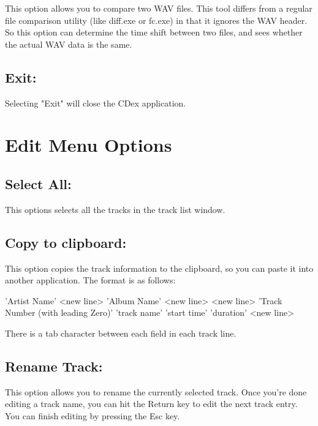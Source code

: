 This option allows you to compare two WAV files. This tool differs from a
regular file comparison utility (like diff.exe or fc.exe) in that it ignores
the WAV header. So this option can determine the time shift between two files, and
sees whether the actual WAV data is the same.


\subsection{Exit:}

Selecting "Exit" will close the CDex application.


\section{Edit Menu Options}


\subsection{Select All:}

This options selects all the tracks in the track list window.

\subsection{Copy to clipboard:}

This option copies the track information to the clipboard, so you can paste
it into another application. The format is as follows:

'Artist Name' <new line>
'Album Name' <new line>
<new line>
'Track Number (with leading Zero)' 'track name' 'start time' 'duration' <new line>

There is a tab character between each field in each track line.



\subsection{Rename Track:}

This option allows you to rename the currently selected track. Once you're done editing a track name,
you can hit the Return key to edit the next track entry. You can finish editing by pressing the 
Esc key.


